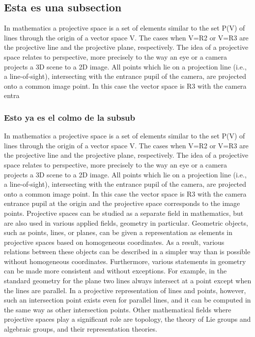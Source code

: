 \subsection{Esta es una subsection}

In mathematics a projective space is a set of elements similar to
the set P(V) of lines through the origin of a vector space V. The
cases when V=R2 or V=R3 are the projective line and the projective
plane, respectively. The idea of a projective space relates to perspective,
more precisely to the way an eye or a camera projects a 3D scene to
a 2D image. All points which lie on a projection line (i.e., a \textquotedbl{}line-of-sight\textquotedbl{}),
intersecting with the entrance pupil of the camera, are projected
onto a common image point. In this case the vector space is R3 with
the camera entra


\subsubsection{Esto ya es el colmo de la subsub}

In mathematics a projective space is a set of elements similar to
the set P(V) of lines through the origin of a vector space V. The
cases when V=R2 or V=R3 are the projective line and the projective
plane, respectively. The idea of a projective space relates to perspective,
more precisely to the way an eye or a camera projects a 3D scene to
a 2D image. All points which lie on a projection line (i.e., a \textquotedbl{}line-of-sight\textquotedbl{}),
intersecting with the entrance pupil of the camera, are projected
onto a common image point. In this case the vector space is R3 with
the camera entrance pupil at the origin and the projective space corresponds
to the image points. Projective spaces can be studied as a separate
field in mathematics, but are also used in various applied fields,
geometry in particular. Geometric objects, such as points, lines,
or planes, can be given a representation as elements in projective
spaces based on homogeneous coordinates. As a result, various relations
between these objects can be described in a simpler way than is possible
without homogeneous coordinates. Furthermore, various statements in
geometry can be made more consistent and without exceptions. For example,
in the standard geometry for the plane two lines always intersect
at a point except when the lines are parallel. In a projective representation
of lines and points, however, such an intersection point exists even
for parallel lines, and it can be computed in the same way as other
intersection points. Other mathematical fields where projective spaces
play a significant role are topology, the theory of Lie groups and
algebraic groups, and their representation theories.

